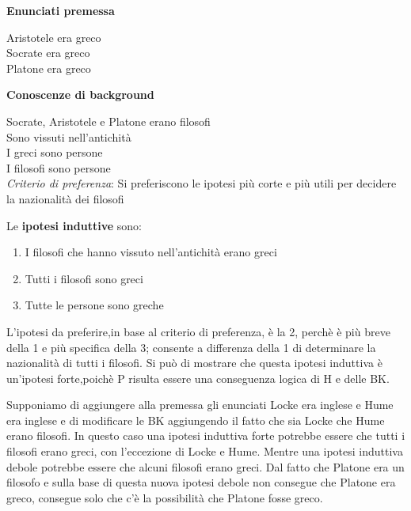 \textbf{Enunciati premessa}
\begin{rientra}
 Aristotele era greco \\Socrate era greco\\Platone era greco\\
 \end{rientra}
 
\textbf{Conoscenze di background}
\begin{rientra}
Socrate, Aristotele e Platone erano filosofi \\Sono vissuti nell'antichità\\I greci sono persone\\
I filosofi sono persone\\ \emph{Criterio di preferenza}: Si preferiscono le ipotesi più corte e più utili per decidere la nazionalità dei filosofi\\
\end{rientra}

Le \textbf{ipotesi induttive} sono:
\begin{enumerate}
\item I filosofi che hanno vissuto nell'antichità erano greci
\item Tutti i filosofi sono greci
\item Tutte le persone sono greche
\end{enumerate}

L'ipotesi da preferire,in base al criterio di preferenza, è la 2, perchè è più breve della 1 e più specifica della 3; consente a differenza della 1 di determinare la nazionalità di tutti i filosofi. Si può di mostrare che questa ipotesi induttiva è un'ipotesi forte,poichè \ac{P} risulta essere una conseguenza logica di \ac{H} e delle \ac{BK}.

Supponiamo di aggiungere alla premessa gli enunciati  Locke era inglese e Hume era inglese e di modificare le \ac{BK} aggiungendo il fatto che sia Locke che Hume erano filosofi. In questo caso una ipotesi induttiva forte potrebbe essere che tutti i filosofi erano greci, con l’eccezione di Locke e Hume. Mentre una ipotesi induttiva debole potrebbe essere che alcuni filosofi erano greci. Dal fatto che Platone era un filosofo e sulla base di questa nuova ipotesi debole non consegue che Platone era greco, consegue solo che c'è la possibilità che Platone fosse greco.

